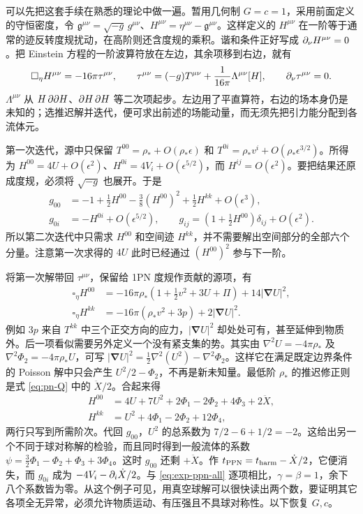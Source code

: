 可以先把这套手续在熟悉的理论中做一遍。暂用几何制 $G=c=1$，采用前面定义的守恒密度，令 $\mathfrak g^{\mu\nu}=\sqrt{-g}\,g^{\mu\nu}$、$H^{\mu\nu}=\eta^{\mu\nu}-\mathfrak g^{\mu\nu}$。这样定义的 $H^{\mu\nu}$ 在一阶等于通常的迹反转度规扰动，在高阶则还含度规的乘积。谐和条件正好写成 $\partial_\nu H^{\mu\nu}=0$。把 Einstein 方程的一阶波算符放在左边，其余项移到右边，就有
\[
 \square_\eta H^{\mu\nu}=-16\pi\tau^{\mu\nu},\qquad
 \tau^{\mu\nu}=(-g)T^{\mu\nu}+\frac{1}{16\pi}\Lambda^{\mu\nu}[H],
 \qquad \partial_\nu\tau^{\mu\nu}=0 .
\]
$\Lambda^{\mu\nu}$ 从 $H\,\partial\partial H$、$\partial H\,\partial H$ 等二次项起步。左边用了平直算符，右边的场本身仍是未知的；选推迟解并迭代，便可求出前述的场能动量，而无须先把引力能分配到各流体元。

第一次迭代，源中只保留 $T^{00}=\rho_*+O(\rho_*\epsilon)$ 和 $T^{0i}=\rho_*v^i+O(\rho_*\epsilon^{3/2})$。所得为 $H^{00}=4U+O(\epsilon^2)$、$H^{0i}=4V_i+O(\epsilon^{5/2})$，而 $H^{ij}=O(\epsilon^2)$。要把结果还原成度规，必须将 $\sqrt{-g}$ 也展开。于是
\begin{align*}
 g_{00}&=-1+\tfrac12H^{00}-\tfrac38(H^{00})^2+\tfrac12H^{kk}
                         +O(\epsilon^3),\\
 g_{0i}&=-H^{0i}+O(\epsilon^{5/2}),\qquad
 g_{ij}=(1+\tfrac12H^{00})\delta_{ij}+O(\epsilon^2).
\end{align*}
所以第二次迭代中只需求 $H^{00}$ 和空间迹 $H^{kk}$，并不需要解出空间部分的全部六个分量。注意第一次求得的 $4U$ 此时已经通过 $(H^{00})^2$ 参与下一阶。

将第一次解带回 $\tau^{\mu\nu}$，保留给 1PN 度规作贡献的源项，有
\begin{align*}
 \square_\eta H^{00}&=-16\pi\rho_*(1+\tfrac12v^2+3U+\Pi)
                          +14|\bm\nabla U|^2,\\
 \square_\eta H^{kk}&=-16\pi(\rho_*v^2+3p)+2|\bm\nabla U|^2 .
\end{align*}
例如 $3p$ 来自 $T^{kk}$ 中三个正交方向的应力，$|\bm\nabla U|^2$ 却处处可有，甚至延伸到物质外。后一项看似需要另外定义一个没有紧支集的势。其实由 $\nabla^2U=-4\pi\rho_*$ 及 $\nabla^2\Phi_2=-4\pi\rho_*U$，可写 $|\bm\nabla U|^2=\tfrac12\nabla^2(U^2)-\nabla^2\Phi_2$。这样它在满足既定边界条件的 Poisson 解中只会产生 $U^2/2-\Phi_2$，不再是新未知量。最低阶 $\rho_*$ 的推迟修正则是式 \eqref{eq:pn-Q} 中的 $\ddot X/2$。合起来得
\begin{align*}
 H^{00}&=4U+7U^2+2\Phi_1-2\Phi_2+4\Phi_3+2\ddot X,\\
 H^{kk}&=U^2+4\Phi_1-2\Phi_2+12\Phi_4 ,
\end{align*}
两行只写到所需阶次。代回 $g_{00}$，$U^2$ 的总系数为 $7/2-6+1/2=-2$。这给出另一个不同于球对称解的检验，而且同时得到一般流体的系数 $\psi=\tfrac32\Phi_1-\Phi_2+\Phi_3+3\Phi_4$。这时 $g_{00}$ 还剩 $+\ddot X$。作 $t_{\rm PPN}=t_{\rm harm}-\dot X/2$，它便消失，而 $g_{0i}$ 成为 $-4V_i-\partial_i\dot X/2$。与 \eqref{eq:exp-ppn-all} 逐项相比，$\gamma=\beta=1$，余下八个系数皆为零。从这个例子可见，用真空球解可以很快读出两个数，要证明其它各项全无异常，必须允许物质运动、有压强且不具球对称性。以下恢复 $G,c$。

